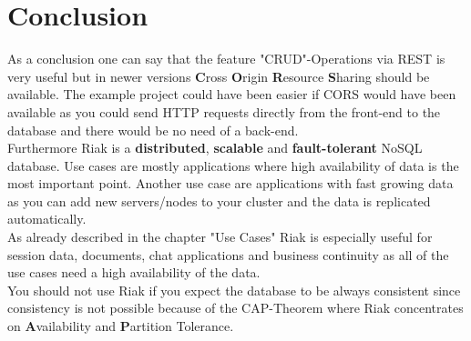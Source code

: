 \section{Conclusion}
As a conclusion one can say that the feature "CRUD"-Operations via REST is very useful but in newer versions \textbf{C}ross \textbf{O}rigin \textbf{R}esource \textbf{S}haring should be available. The example project could have been easier if CORS would have been available as you could send HTTP requests directly from the front-end to the database and there would be no need of a back-end. 
\\
Furthermore Riak is a \textbf{distributed}, \textbf{scalable} and \textbf{fault-tolerant} NoSQL database. Use cases are mostly applications where high availability of data is the most important point. Another use case are applications with fast growing data as you can add new servers/nodes to your cluster and the data is replicated automatically. \cite{Basho.06.04.2017} 
\\
As already described in the chapter "Use Cases" Riak is especially useful for session data, documents, chat applications and business continuity as all of the use cases need a high availability of the data. \cite{Basho.06.04.2017}
\\
You should not use Riak if you expect the database to be always consistent since consistency is not possible because of the CAP-Theorem where Riak concentrates on \textbf{A}vailability and \textbf{P}artition Tolerance.	